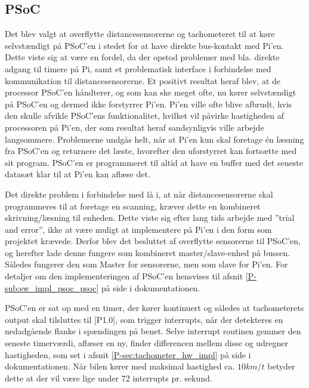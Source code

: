 \subsection{PSoC} \label{sec:swd_psoc_board}

Det blev valgt at overflytte distancesensorerne og tachometeret til at køre selvstændigt på PSoC'en i stedet for at have direkte bus-kontakt med Pi'en. 
Dette viste sig at være en fordel, da der opstod problemer med bla. direkte adgang til timere på Pi, samt et problematisk interface i forbindelse med \IIC kommunikation til distancesensorerne.
Et positivt resultat heraf blev, at de processor PSoC'en håndterer, og som kan ske meget ofte, nu kører selvstændigt på PSoC'en og dermed ikke forstyrrer Pi'en.
Pi'en ville ofte blive afbrudt, hvis den skulle afvikle PSoC'ens funktionalitet, hvilket vil påvirke hastigheden af processoren på Pi'en, der som resultat heraf sandsynligvis ville arbejde langsommere.
Problemerne undgås helt, når at Pi'en kun skal foretage én læsning fra PSoC'en og returnere det læste, hvorefter den uforstyrret kan fortsætte med sit program.
PSoC'en er programmeret til altid at have en buffer med det seneste datasæt klar til at Pi'en kan aflæse det. 

Det direkte problem i forbindelse med \IIC lå i, at når distancesensorerne skal programmeres til at foretage en scanning, kræver dette en kombineret skrivning/læsning til enheden. 
Dette viste sig efter lang tids arbejde med ''trial and error'', ikke at være muligt at implementere på Pi'en i den form som projektet krævede. 
Derfor blev det besluttet af overflytte sensorerne til PSoC'en, og herefter lade denne fungere som kombineret master/slave-enhed på \IIC bussen. 
Således fungerer den som Master for sensorerne, men som slave for Pi'en. For detaljer om den implementeringen af PSoC'en hensvises til afsnit \ref{P-sub:sw_impl_psoc_psoc}  på side \pageref{P-sub:sw_impl_psoc_psoc} i dokumentationen.

PSoC'en er sat op med en timer, der kører kontinuert og således at tachometerets output skal tilsluttes til [P1.0], som trigger interrupts, når der detekteres en nedadgående flanke i spændingen på benet. 
Selve interrupt routinen gemmer den seneste timerværdi, aflæser en ny, finder differencen mellem disse og udregner hastigheden, som set i afsnit 
\ref{P-sec:tachometer_hw_impl}  på side \pageref{P-sec:tachometer_hw_impl} i dokumentationen. 
Når bilen kører med maksimal hastighed ca. $10km/t$ betyder dette at der vil være lige under 72 interrupts pr. sekund.

